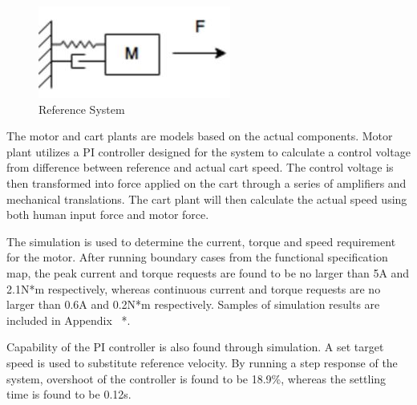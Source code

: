 \begin{figure}[h]
	\centering
	\includegraphics[width=0.5\linewidth]{Images/MSB}
	\caption{Reference System}
	\label{MSB}
\end{figure}

The motor and cart plants are models based on the actual components. Motor plant utilizes a PI controller designed for the system to calculate a control voltage from difference between reference and actual cart speed. The control voltage is then transformed into force applied on the cart through a series of amplifiers and mechanical translations. The cart plant will then calculate the actual speed using both human input force and motor force.

The simulation is used to determine the current, torque and speed requirement for the motor. After running boundary cases from the functional specification map, the peak current and torque requests are found to be no larger than 5A and 2.1N*m respectively, whereas continuous current and torque requests are no larger than 0.6A and 0.2N*m respectively. Samples of simulation results are included in Appendix {{\color{red}\ *}}.

Capability of the PI controller is also found through simulation. A set target speed is used to substitute reference velocity. By running a step response of the system, overshoot of the controller is found to be 18.9\%, whereas the settling time is found to be 0.12s.